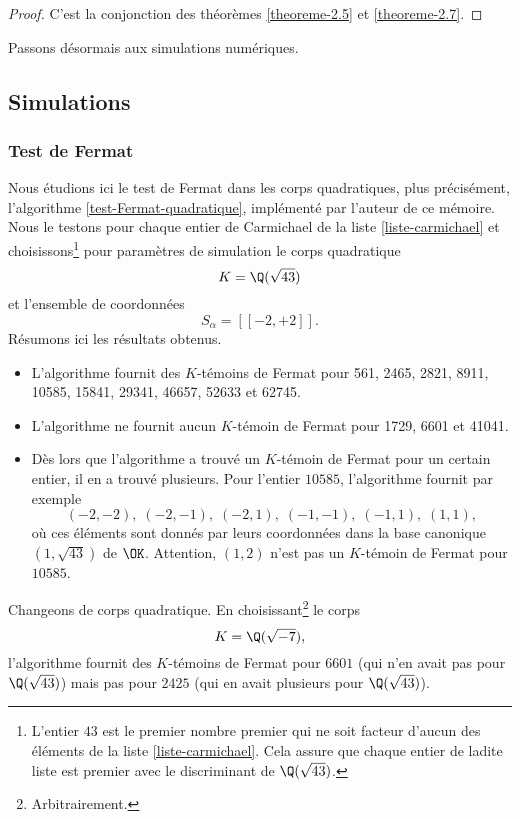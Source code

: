 \begin{proof}
	C'est la conjonction des théorèmes \ref{theoreme-2.5} et \ref{theoreme-2.7}.
\end{proof}

Passons désormais aux simulations numériques.

\subsection{Simulations}

\subsubsection{Test de Fermat}

Nous étudions ici le test de Fermat dans les corps quadratiques, plus précisément, l'algorithme \ref{test-Fermat-quadratique}, implémenté par l'auteur de ce mémoire. Nous le testons pour chaque entier de Carmichael de la liste \ref{liste-carmichael} et choisissons\footnote{L'entier $43$ est le premier nombre premier qui ne soit facteur d'aucun des éléments de la liste \ref{liste-carmichael}. Cela assure que chaque entier de ladite liste est premier avec le discriminant de $\Q(\sqrt{43})$.} pour paramètres de simulation le corps quadratique \[K = \Q(\sqrt{43})\] et l'ensemble de coordonnées \[S_\alpha = [\![-2, +2]\!].\] Résumons ici les résultats obtenus.
\begin{itemize}
	\item L'algorithme fournit des $K$-témoins de Fermat pour 561, 2465, 2821, 8911, 10585, 15841, 29341, 46657, 52633 et 62745.
	\item L'algorithme ne fournit aucun $K$-témoin de Fermat pour 1729, 6601 et 41041.
	\item Dès lors que l'algorithme a trouvé un $K$-témoin de Fermat pour un certain entier, il en a trouvé plusieurs. Pour l'entier $10585$, l'algorithme fournit par exemple \[(-2, -2), \; (-2, -1), \; (-2, 1), \; (-1, -1), \; (-1, 1), \; (1, 1),\] où ces éléments sont donnés par leurs coordonnées dans la base canonique $(1, \sqrt{43})$ de $\OK$. Attention, $(1, 2)$ n'est pas un $K$-témoin de Fermat pour $10585$.
\end{itemize}

Changeons de corps quadratique. En choisissant\footnote{Arbitrairement.} le corps \[K = \Q(\sqrt{-7}),\] l'algorithme fournit des $K$-témoins de Fermat pour $6601$ (qui n'en avait pas pour $\Q(\sqrt{43})$) mais pas pour $2425$ (qui en avait plusieurs pour $\Q(\sqrt{43})$). \\

